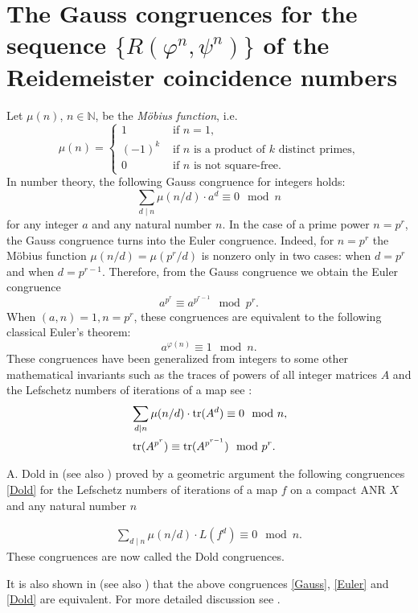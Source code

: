 \documentclass[12pt, a4paper]{amsart}
\def\tr{\mathop{\rm tr}\nolimits}
\def\N{{\mathbb N}}
\begin{document}
\bigskip
\section{The Gauss congruences  for  the sequence   $\{R(\varphi^n,\psi^n)\}$ of the   Reidemeister coincidence numbers }\label{sec:congruences}

Let $\mu(n)$, $n\in\N$, be the {\em M\"obius function},
i.e.
$$
\mu(n) =
\left\{
\begin{array}{ll}
1 & \mbox{ if } n=1,  \\
(-1)^k & \mbox{ if }  n  \mbox{ is a product of } k \mbox{ distinct primes,}\\
0 & \mbox{ if }  n  \mbox{ is not square-free.}
\end{array}
\right.
$$
In number theory, the following Gauss congruence for integers holds:
$$
\sum_{d\mid n}\mu(n/d)\cdot a^{d}\equiv 0\mod n
$$
for any integer $a$ and any natural number $n$. In the case of a prime power $n=p^r$, the Gauss congruence turns into the Euler congruence. Indeed, for $n=p^r$ the M\"obius function $\mu(n/d)=\mu(p^r/d)$ is nonzero only in two cases: when $d=p^r$ and when $d=p^{r-1}$. Therefore, from the Gauss congruence we obtain the Euler congruence
$$
a^{p^r}\equiv a^{p^{r-1}}\mod p^r.
$$
When $(a,n)=1, n=p^r$, these congruences are equivalent to the following classical Euler's theorem:
$$
a^{\varphi(n)}\equiv 1\mod n.
$$
These congruences have been generalized from integers to some other mathematical invariants such as the traces of powers of all integer matrices $A$ and the Lefschetz numbers of iterations  of a map {see \cite{mp99,Z}}:
\begin{align}
\label{Gauss}
&\sum_{d\mid n}\mu(n/d)\cdot \tr(A^{d})\equiv 0\mod n,\\
\label{Euler}
&\tr(A^{p^r})\equiv\tr(A^{p^{r-1}})\mod p^r.
\end{align}
{A. Dold in \cite{Dold83} (see also \cite[Theorem 3.1.4]{JezMar}) proved by a geometric argument the following congruences \eqref{Dold} for the Lefschetz numbers of iterations of a map $f$ on a compact ANR $X$ and any natural number $n$

\begin{align}
\label{Dold}
\sum_{d\mid n}\mu(n/d)\cdot L(f^{d})\equiv 0\mod n .\tag{DL}
\end{align}
 These congruences are now called the Dold congruences.} It is also shown in \cite{mp99} (see also \cite[Theorem~9]{Z}) that the above congruences \eqref{Gauss}, \eqref{Euler} and \eqref{Dold} are equivalent.
 For more detailed discussion see \cite{ByszGraffWard}.
\end{document}
